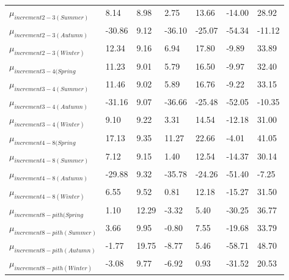 \documentclass{article}\usepackage[]{graphicx}\usepackage[]{color}
\begin{document}
\begin{table}[ht]
\begin{tabular}{|p{}|p{}|p{}|p{}|p{}|p{}|p{}|}
  $\mu_{increment 2-3 (Summer)}$ & 8.14 & 8.98 & 2.75 & 13.66 & -14.00 & 28.92 \\ 
  $\mu_{increment 2-3 (Autumn)}$ & -30.86 & 9.12 & -36.10 & -25.07 & -54.34 & -11.12 \\ 
  $\mu_{increment 2-3 (Winter)}$ & 12.34 & 9.16 & 6.94 & 17.80 & -9.89 & 33.89 \\ 
  $\mu_{increment 3-4 (Spring}$ & 11.23 & 9.01 & 5.79 & 16.50 & -9.97 & 32.40 \\ 
  $\mu_{increment 3-4 (Summer)}$ & 11.46 & 9.02 & 5.89 & 16.76 & -9.22 & 33.15 \\ 
  $\mu_{increment 3-4 (Autumn)}$ & -31.16 & 9.07 & -36.66 & -25.48 & -52.05 & -10.35 \\ 
  $\mu_{increment 3-4 (Winter)}$ & 9.10 & 9.22 & 3.31 & 14.54 & -12.18 & 31.00 \\ 
  $\mu_{increment 4-8 (Spring}$ & 17.13 & 9.35 & 11.27 & 22.66 & -4.01 & 41.05 \\ 
  $\mu_{increment 4-8 (Summer)}$ & 7.12 & 9.15 & 1.40 & 12.54 & -14.37 & 30.14 \\ 
  $\mu_{increment 4-8 (Autumn)}$ & -29.88 & 9.32 & -35.78 & -24.26 & -51.40 & -7.25 \\ 
  $\mu_{increment 4-8 (Winter)}$ & 6.55 & 9.52 & 0.81 & 12.18 & -15.27 & 31.50 \\ 
  $\mu_{increment 8-pith (Spring}$ & 1.10 & 12.29 & -3.32 & 5.40 & -30.25 & 36.77 \\ 
  $\mu_{increment 8-pith (Summer)}$ & 3.66 & 9.95 & -0.80 & 7.55 & -19.68 & 33.79 \\ 
  $\mu_{increment 8-pith (Autumn)}$ & -1.77 & 19.75 & -8.77 & 5.46 & -58.71 & 48.70 \\ 
  $\mu_{increment 8-pith (Winter)}$ & -3.08 & 9.77 & -6.92 & 0.93 & -31.52 & 20.53 \\ 
   \hline
\end{tabular}
\endgroup
\end{table}
\end{document}
